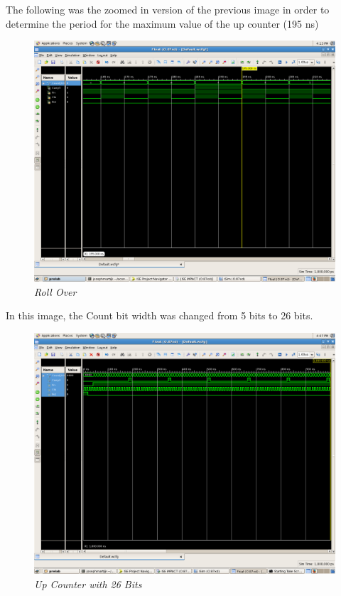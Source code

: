 \documentclass[a4paper,12pt]{article}
\begin{document}
  \newpage
  
  The following was the zoomed in version of the previous image in order to determine the period for the maximum value of the up counter (195 ns)
  
  \begin{figure}[h]
    \begin{center}
      \includegraphics[scale=.18]{RollOver.png}
      \caption{\textit{Roll Over}}
    \end{center}
  \end{figure}
  
  In this image, the Count bit width was changed from 5 bits to 26 bits.
  
  \begin{figure}[h]
    \begin{center}
      \includegraphics[scale=.18]{up_Count_waveform.png}
      \caption{\textit{Up Counter with 26 Bits}}
    \end{center}
  \end{figure}
  \newpage
  
\end{document}

